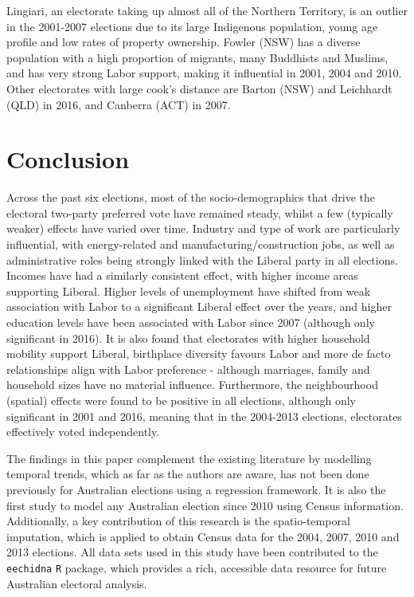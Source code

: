 \documentclass[openany]{book}
\begin{document}
Lingiari, an electorate taking up almost all of the Northern Territory, is an outlier in the 2001-2007 elections due to its large Indigenous population, young age profile and low rates of property ownership. Fowler (NSW) has a diverse population with a high proportion of migrants, many Buddhists and Muslims, and has very strong Labor support, making it influential in 2001, 2004 and 2010. Other electorates with large cook's distance are Barton (NSW) and Leichhardt (QLD) in 2016, and Canberra (ACT) in 2007.

\hypertarget{conclusion}{%
\chapter{Conclusion}\label{conclusion}}

Across the past six elections, most of the socio-demographics that drive the electoral two-party preferred vote have remained steady, whilst a few (typically weaker) effects have varied over time. Industry and type of work are particularly influential, with energy-related and manufacturing/construction jobs, as well as administrative roles being strongly linked with the Liberal party in all elections. Incomes have had a similarly consistent effect, with higher income areas supporting Liberal. Higher levels of unemployment have shifted from weak association with Labor to a significant Liberal effect over the years, and higher education levels have been associated with Labor since 2007 (although only significant in 2016). It is also found that electorates with higher household mobility support Liberal, birthplace diversity favours Labor and more de facto relationships align with Labor preference - although marriages, family and household sizes have no material influence. Furthermore, the neighbourhood (spatial) effects were found to be positive in all elections, although only significant in 2001 and 2016, meaning that in the 2004-2013 elections, electorates effectively voted independently.

The findings in this paper complement the existing literature by modelling temporal trends, which as far as the authors are aware, has not been done previously for Australian elections using a regression framework. It is also the first study to model any Australian election since 2010 using Census information. Additionally, a key contribution of this research is the spatio-temporal imputation, which is applied to obtain Census data for the 2004, 2007, 2010 and 2013 elections. All data sets used in this study have been contributed to the \texttt{eechidna} \texttt{R} package, which provides a rich, accessible data resource for future Australian electoral analysis.
\end{document}
